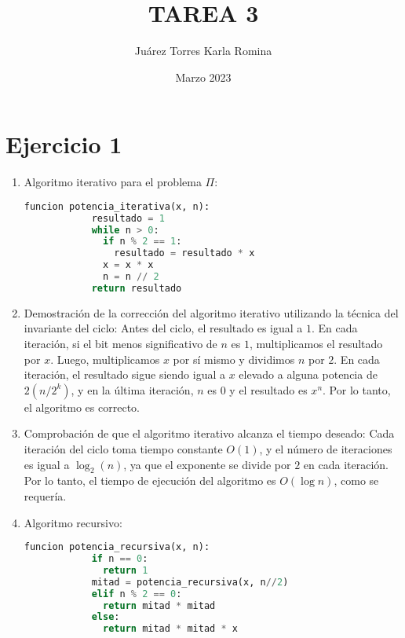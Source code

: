 \documentclass{article}
\title{TAREA 3}
\author{Juárez Torres Karla Romina}
\date{Marzo 2023}
\begin{document}
\maketitle

\section{Ejercicio 1} 

  \begin{enumerate}
    \item Algoritmo iterativo para el problema $\Pi$:

    \begin{lstlisting}[language=python]
          funcion potencia_iterativa(x, n):
            resultado = 1
            while n > 0:
              if n % 2 == 1:
                resultado = resultado * x
              x = x * x
              n = n // 2
            return resultado
    \end{lstlisting}

  \item 
    Demostración de la corrección del algoritmo iterativo utilizando la técnica del invariante del ciclo:
      Antes del ciclo, el resultado es igual a $1$. En cada iteración, si el bit menos significativo de $n$ es $1$, multiplicamos el resultado por $x$.
      Luego, multiplicamos $x$ por sí mismo y dividimos $n$ por $2$. En cada iteración, el resultado sigue siendo igual a $x$ elevado a alguna potencia de 
      $2 (n/2^k)$, y en la última iteración, $n$ es $0$ y el resultado es $x^n$. Por lo tanto, el algoritmo es correcto.


  \item Comprobación de que el algoritmo iterativo alcanza el tiempo deseado:
       Cada iteración del ciclo toma tiempo constante $O(1)$, y el número de iteraciones es igual a $\log_2(n)$, 
        ya que el exponente se divide por $2$ en cada iteración. Por lo tanto, el tiempo de ejecución del algoritmo es 
        $O(\log n)$, como se requería.
       

\newpage
  \item Algoritmo recursivo:
        \begin{lstlisting}[language=python]
          funcion potencia_recursiva(x, n):
            if n == 0:
              return 1
            mitad = potencia_recursiva(x, n//2)
            elif n % 2 == 0:
              return mitad * mitad
            else:
              return mitad * mitad * x


        \end{lstlisting}


\end{enumerate}
\end{document}
